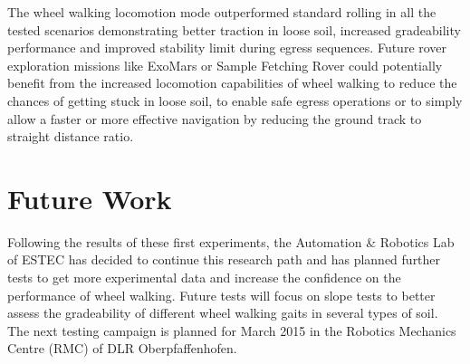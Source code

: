 \documentclass[a4paper,twocolumn]{esapub2005} %
\begin{document}
The wheel walking locomotion mode outperformed standard rolling in all the tested scenarios demonstrating better traction in loose soil, increased gradeability performance and improved stability limit during egress sequences. Future rover exploration missions like ExoMars or Sample Fetching Rover could potentially benefit from the increased locomotion capabilities of wheel walking to reduce the chances of getting stuck in loose soil, to enable safe egress operations or to simply allow a faster or more effective navigation by reducing the ground track to straight distance ratio.

\section{Future Work}

Following the results of these first experiments, the Automation \& Robotics Lab of ESTEC has decided to continue this research path and has planned further tests to get more experimental data and increase the confidence on the performance of wheel walking. 
Future tests will focus on slope tests to better assess the gradeability of different wheel walking gaits in several types of soil.
The next testing campaign is planned for March 2015 in the Robotics Mechanics Centre (RMC) of DLR Oberpfaffenhofen.


\vspace{-3 mm}




\end{document}
